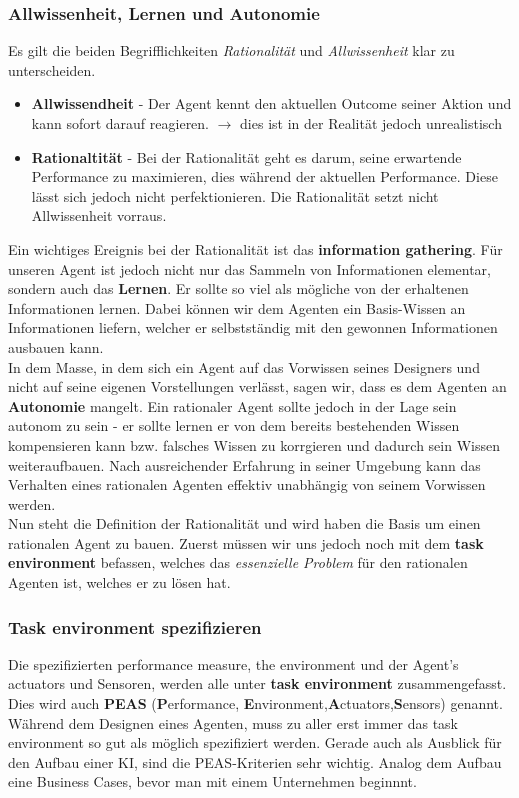 \documentclass{article}
\theoremstyle{merke}
\theoremstyle{definition}
\begin{document}
\subsubsection{Allwissenheit, Lernen und Autonomie}
Es gilt die beiden Begrifflichkeiten \textit{Rationalität} und \textit{Allwissenheit} klar zu unterscheiden.
\begin{itemize}
\item \textbf{Allwissendheit} - Der Agent kennt den aktuellen Outcome seiner Aktion und kann sofort darauf reagieren. $\rightarrow$ dies ist in der Realität jedoch unrealistisch
\item \textbf{Rationaltität} - Bei der Rationalität geht es darum, seine erwartende Performance zu maximieren, dies während der aktuellen Performance. Diese lässt sich jedoch nicht perfektionieren. Die Rationalität setzt nicht Allwissenheit vorraus.
\end{itemize}
Ein wichtiges Ereignis bei der Rationalität ist das \textbf{information gathering}. Für unseren Agent ist jedoch nicht nur das Sammeln von Informationen elementar, sondern auch das \textbf{Lernen}. Er sollte so viel als mögliche von der erhaltenen Informationen lernen. Dabei können wir dem Agenten ein Basis-Wissen an Informationen liefern, welcher er selbstständig mit den gewonnen Informationen ausbauen kann. \\
In dem Masse, in dem sich ein Agent auf das Vorwissen seines Designers und nicht auf seine eigenen Vorstellungen verlässt, sagen wir, dass es dem Agenten an \textbf{Autonomie} mangelt. Ein rationaler Agent sollte jedoch in der Lage sein autonom zu sein - er sollte lernen er von dem bereits bestehenden Wissen kompensieren kann bzw. falsches Wissen zu korrgieren und dadurch sein Wissen weiteraufbauen. Nach ausreichender Erfahrung in seiner Umgebung kann das Verhalten eines rationalen Agenten effektiv unabhängig von seinem Vorwissen werden.\\

Nun steht die Definition der Rationalität und wird haben die Basis um einen rationalen Agent zu bauen. Zuerst müssen wir uns jedoch noch mit dem \textbf{task environment} befassen, welches das \textit{essenzielle Problem} für den rationalen Agenten ist, welches er zu lösen hat.

\subsubsection{Task environment spezifizieren}
Die spezifizierten performance measure, the environment und der Agent's actuators und Sensoren, werden alle unter \textbf{task environment} zusammengefasst. Dies wird auch \textbf{PEAS} (\textbf{P}erformance, \textbf{E}nvironment,\textbf{A}ctuators,\textbf{S}ensors) genannt. Während dem Designen eines Agenten, muss zu aller erst immer das task environment so gut als möglich spezifiziert werden. Gerade auch als Ausblick für den Aufbau einer KI, sind die PEAS-Kriterien sehr wichtig. Analog dem Aufbau eine Business Cases, bevor man mit einem Unternehmen beginnnt.
\end{document}
